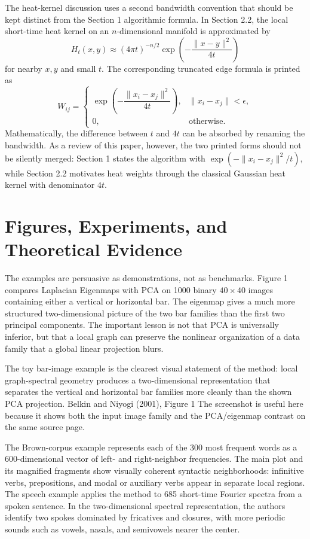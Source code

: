 \documentclass[11pt]{article}
\begin{document}
The heat-kernel discussion uses a second bandwidth convention that should be
kept distinct from the Section 1 algorithmic formula. In Section 2.2, the local
short-time heat kernel on an \(n\)-dimensional manifold is approximated by
\[
  H_t(x,y)\approx (4\pi t)^{-n/2}
  \exp\!\left(-\frac{\|x-y\|^2}{4t}\right)
\]
for nearby \(x,y\) and small \(t\). The corresponding truncated edge formula is
printed as
\[
  W_{ij}=
  \begin{cases}
    \exp\!\left(-\dfrac{\|x_i-x_j\|^2}{4t}\right),
      & \|x_i-x_j\|<\epsilon,\\
    0, & \text{otherwise.}
  \end{cases}
\]
Mathematically, the difference between \(t\) and \(4t\) can be absorbed by
renaming the bandwidth. As a review of this paper, however, the two printed
forms should not be silently merged: Section 1 states the algorithm with
\(\exp(-\|x_i-x_j\|^2/t)\), while Section 2.2 motivates heat weights through the
classical Gaussian heat kernel with denominator \(4t\).

\section{Figures, Experiments, and Theoretical Evidence}

The examples are persuasive as demonstrations, not as benchmarks. Figure 1
compares Laplacian Eigenmaps with PCA on 1000 binary \(40\times 40\) images
containing either a vertical or horizontal bar. The eigenmap gives a much more
structured two-dimensional picture of the two bar families than the first two
principal components. The important lesson is not that PCA is universally
inferior, but that a local graph can preserve the nonlinear organization of a
data family that a global linear projection blurs.

{The toy bar-image example is the clearest visual statement of the method: local
graph-spectral geometry produces a two-dimensional representation that separates
the vertical and horizontal bar families more cleanly than the shown PCA
projection.}
{Belkin and Niyogi (2001), Figure 1}
{The screenshot is useful here because it shows both the input image family and
the PCA/eigenmap contrast on the same source page.}

The Brown-corpus example represents each of the 300 most frequent words as a
600-dimensional vector of left- and right-neighbor frequencies. The main plot and
its magnified fragments show visually coherent syntactic neighborhoods:
infinitive verbs, prepositions, and modal or auxiliary verbs appear in separate
local regions. The speech example applies the method to 685 short-time Fourier
spectra from a spoken sentence. In the two-dimensional spectral representation,
the authors identify two spokes dominated by fricatives and closures, with more
periodic sounds such as vowels, nasals, and semivowels nearer the center.
\end{document}
